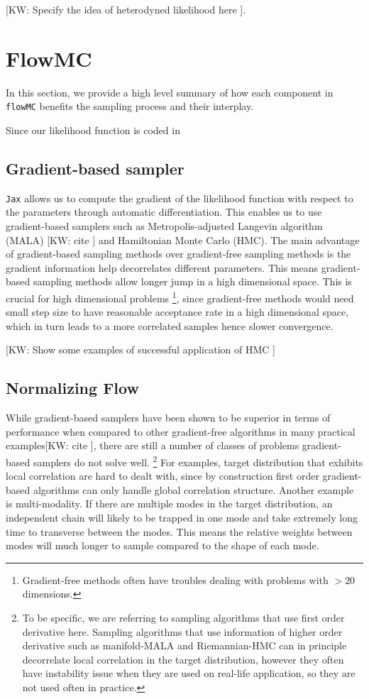 \documentclass[twocolumn]{aastex631}
\newcommand{\kw}[1]{{\color{rb4}[KW: #1 ]}}
\begin{document}
\kw{Specify the idea of heterodyned likelihood here}.

\section{FlowMC}

In this section, we provide a high level summary of how each component in \texttt{flowMC} benefits the sampling process and their interplay.

Since our likelihood function is coded in 
\subsection{Gradient-based sampler}
\label{sec:gradient}

\texttt{Jax} allows us to compute the gradient of the likelihood function with
respect to the parameters through automatic differentiation. This enables us to
use gradient-based samplers such as Metropolis-adjusted Langevin algorithm
(MALA) \kw{cite} and Hamiltonian Monte Carlo (HMC)\cite{kw}. The main advantage
of gradient-based sampling methods over gradient-free sampling methods is the
gradient information help decorrelates different parameters. This means
gradient-based sampling methods allow longer jump in a high dimensional space.
This is crucial for high dimensional problems \footnote{Gradient-free methods
often have troubles dealing with problems with $>20$ dimensions.}, since
gradient-free methods would need small step size to have reasonable acceptance
rate in a high dimensional space, which in turn leads to a more correlated
samples hence slower convergence.

\kw{Show some examples of successful application of HMC}

\subsection{Normalizing Flow}
\label{sec:flow}

While gradient-based samplers have been shown to be superior in terms of
performance when compared to other gradient-free algorithms in many practical
examples\kw{cite}, there are still a number of classes of problems
gradient-based samplers do not solve well. \footnote{To be specific, we are
referring to sampling algorithms that use first order derivative here. Sampling
algorithms that use information of higher order derivative such as manifold-MALA
and Riemannian-HMC can in principle decorrelate local correlation in the target
distribution, however they often have instability issue when they are used on
real-life application, so they are not used often in practice.} For examples,
target distribution that exhibits local correlation are hard to dealt with,
since by construction first order gradient-based algorithms can only handle
global correlation structure. Another example is multi-modality. If there are
multiple modes in the target distribution, an independent chain will likely to
be trapped in one mode and take extremely long time to transverse between the
modes. This means the relative weights between modes will much longer to sample
compared to the shape of each mode.
\end{document}
